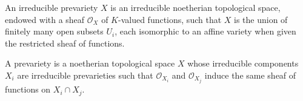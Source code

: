An irreducible prevariety $X$ is an irreducible noetherian topological space, endowed with a sheaf $\mathcal{O}_X$ of $K$-valued functions, such that $X$ is the union of finitely many open subsets $U_i$, each isomorphic to an affine variety when given the restricted sheaf of functions.

A prevariety is a noetherian topological space $X$ whose irreducible components $X_i$ are irreducible prevarieties such that $\mathcal{O}_{X_i}$ and $\mathcal{O}_{X_j}$ induce the same sheaf of functions on $X_i \cap X_j$.
